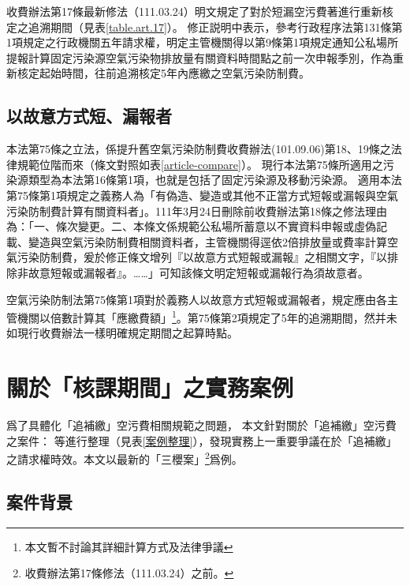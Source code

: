 \documentclass[11pt,a4paper]{article}
\begin{document}
收費辦法第17條最新修法（111.03.24）明文規定了對於短漏空污費著進行重新核定之追溯期間（見表\ref{table.art.17}）。
修正説明中表示，參考行政程序法第131條第1項規定之行政機關五年請求權，明定主管機關得以第9條第1項規定通知公私場所提報計算固定污染源空氣污染物排放量有關資料時間點之前一次申報季別，作為重新核定起始時間，往前追溯核定5年內應繳之空氣污染防制費。


\subsection{以故意方式短、漏報者}

本法第75條之立法，係提升舊空氣污染防制費收費辦法(101.09.06)第18、19條之法律規範位階而來（條文對照如表\ref{article-compare}）。
現行本法第75條所適用之污染源類型為本法第16條第1項，也就是包括了固定污染源及移動污染源。
適用本法第75條第1項規定之義務人為「有偽造、變造或其他不正當方式短報或漏報與空氣污染防制費計算有關資料者」。111年3月24日刪除前收費辦法第18條之修法理由為：「一、條次變更。二、本條文係規範公私場所蓄意以不實資料申報或虛偽記載、變造與空氣污染防制費相關資料者，主管機關得逕依2倍排放量或費率計算空氣污染防制費，爰於修正條文增列『以故意方式短報或漏報』之相關文字，『以排除非故意短報或漏報者』。……」可知該條文明定短報或漏報行為須故意者。


空氣污染防制法第75條第1項對於義務人以故意方式短報或漏報者，規定應由各主管機關以倍數計算其「應繳費額」\footnote{本文暫不討論其詳細計算方式及法律爭議}。第75條第2項規定了5年的追溯期間，然并未如現行收費辦法一樣明確規定期間之起算時點。








\section{關於「核課期間」之實務案例}


爲了具體化「追補繳」空污費相關規範之問題，
本文針對關於「追補繳」空污費之案件：
等進行整理（見表\ref{案例整理}），發現實務上一重要爭議在於「追補繳」之請求權時效。本文以最新的「三櫻案」\footnote{收費辦法第17條修法（111.03.24）之前。}爲例。



\subsection{案件背景}
\end{document}
